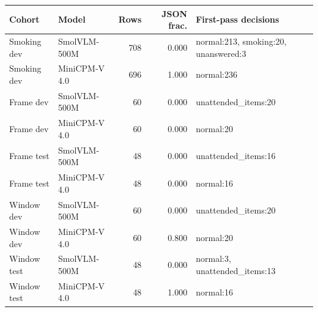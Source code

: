 \begin{longtable}{llrrP{5.0cm}}
\toprule
Cohort & Model & Rows & JSON frac. & First-pass decisions \\
\midrule\endhead
Smoking dev & SmolVLM-500M & 708 & 0.000 & normal:213, smoking:20, unanswered:3 \\
Smoking dev & MiniCPM-V 4.0 & 696 & 1.000 & normal:236 \\
Frame dev & SmolVLM-500M & 60 & 0.000 & unattended\_items:20 \\
Frame dev & MiniCPM-V 4.0 & 60 & 0.000 & normal:20 \\
Frame test & SmolVLM-500M & 48 & 0.000 & unattended\_items:16 \\
Frame test & MiniCPM-V 4.0 & 48 & 0.000 & normal:16 \\
Window dev & SmolVLM-500M & 60 & 0.000 & unattended\_items:20 \\
Window dev & MiniCPM-V 4.0 & 60 & 0.800 & normal:20 \\
Window test & SmolVLM-500M & 48 & 0.000 & normal:3, unattended\_items:13 \\
Window test & MiniCPM-V 4.0 & 48 & 1.000 & normal:16 \\
\bottomrule
\end{longtable}
